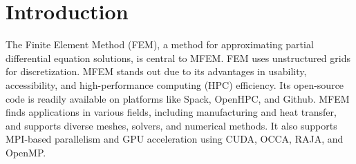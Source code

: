 \section{Introduction}
The Finite Element Method (FEM), a method for approximating partial differential equation solutions, is central to MFEM. FEM uses unstructured grids for discretization. MFEM stands out due to its advantages in usability, accessibility, and high-performance computing (HPC) efficiency. Its open-source code is readily available on platforms like Spack, OpenHPC, and Github. MFEM finds applications in various fields, including manufacturing and heat transfer, and supports diverse meshes, solvers, and numerical methods. It also supports MPI-based parallelism and GPU acceleration using CUDA, OCCA, RAJA, and OpenMP.

